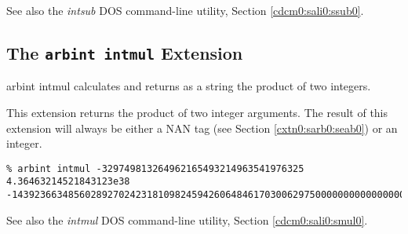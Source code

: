 \begin{tclcommandseealso}
See also the \emph{intsub} DOS command-line utility, 
Section \ref{cdcm0:sali0:ssub0}.
\end{tclcommandseealso}


\subsection{The \texttt{arbint intmul} Extension}
\label{cxtn0:sarb0:smul0}

\begin{tclcommandname}{arbint intmul}%
calculates and returns as a string the product of two integers.
\end{tclcommandname}

\begin{tclcommandsynopsis}
\end{tclcommandsynopsis}

\begin{tclcommanddescription}
This extension returns the product of two integer arguments.
The result of this 
extension will always be either a NAN tag
(see Section \ref{cxtn0:sarb0:seab0}) 
or an integer.
\end{tclcommanddescription}

\begin{tclcommandsampleinvocations}
\begin{scriptsize}
\begin{verbatim}
% arbint intmul -329749813264962165493214963541976325 4.36463214521843123e38
-143923663485602892702423181098245942606484617030062975000000000000000000000
\end{verbatim}
\end{scriptsize}
\end{tclcommandsampleinvocations}

\begin{tclcommandseealso}
See also the \emph{intmul} DOS command-line utility, 
Section \ref{cdcm0:sali0:smul0}.
\end{tclcommandseealso}


